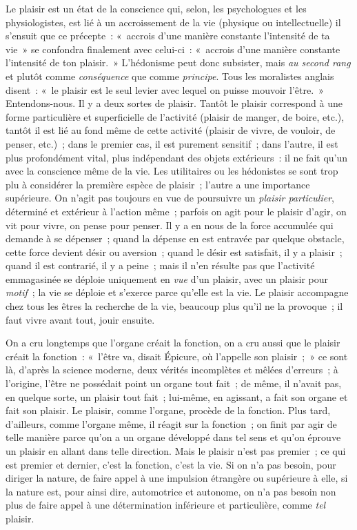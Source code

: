 \documentclass[french,twoside]{book} %
\begin{document}
Le plaisir est un état de la conscience qui, selon, les psychologues et les physiologistes, est lié à un accroissement de la vie (physique ou intellectuelle) il s’ensuit que ce précepte : « accrois d’une manière constante l’intensité de ta vie » se confondra finalement avec celui-ci : « accrois d’une manière constante l’intensité de ton plaisir. » L’hédonisme peut donc subsister, mais \emph{au second rang} et plutôt comme \emph{conséquence} que comme \emph{principe}. Tous les moralistes anglais disent : « le plaisir est le seul levier avec lequel on puisse mouvoir l’être. » Entendons-nous. Il y a deux sortes de plaisir. Tantôt le plaisir correspond à une forme particulière et superficielle de l’activité (plaisir de manger, de boire, etc.), tantôt il est lié au fond même de cette activité (plaisir de vivre, de vouloir, de penser, etc.) ; dans le premier cas, il est purement sensitif ; dans l’autre, il est plus profondément vital, plus indépendant des objets extérieurs : il ne fait qu’un avec la conscience même de la vie. Les utilitaires ou les hédonistes se sont trop plu à considérer la première espèce de plaisir ; l’autre a une importance supérieure. On n’agit pas toujours en vue de poursuivre un \emph{plaisir particulier}, déterminé et extérieur à l’action même ; parfois on agit pour le plaisir d’agir, on vit pour vivre, on pense pour penser. Il y a en nous de la force accumulée qui demande à se dépenser ; quand la dépense en est entravée par quelque obstacle, cette force devient désir ou aversion ; quand le désir est satisfait, il y a plaisir ; quand il est contrarié, il y a peine ; mais il n’en résulte pas que l’activité emmagasinée se déploie uniquement en \emph{vue} d’un plaisir, avec un plaisir pour \emph{motif} ; la vie se déploie et s’exerce parce qu’elle est la vie. Le plaisir accompagne chez tous les êtres la recherche de la vie, beaucoup plus qu’il ne la provoque ; il faut vivre avant tout, jouir ensuite.\par
On a cru longtemps que l’organe créait la fonction, on a cru aussi que le plaisir créait la fonction : « l’être va, disait Épicure, où l’appelle son plaisir ; » ce sont là, d’après la science moderne, deux vérités incomplètes et mêlées d’erreurs ; à l’origine, l’être ne possédait point un organe tout fait ; de même, il n’avait pas, en quelque sorte, un plaisir tout fait ; lui-même, en agissant, a fait son organe et fait son plaisir. Le plaisir, comme l’organe, procède de la fonction. Plus tard, d’ailleurs, comme l’organe même, il réagit sur la fonction ; on finit par agir de telle manière parce qu’on a un organe développé dans tel sens et qu’on éprouve un plaisir en allant dans telle direction. Mais le plaisir n’est pas premier ; ce qui est premier et dernier, c’est la fonction, c’est la vie. Si on n’a pas besoin, pour diriger la nature, de faire appel à une impulsion étrangère ou supérieure à elle, si la nature est, pour ainsi dire, automotrice et autonome, on n’a pas besoin non plus de faire appel à une détermination inférieure et particulière, comme \emph{tel} plaisir.\par
\end{document}
